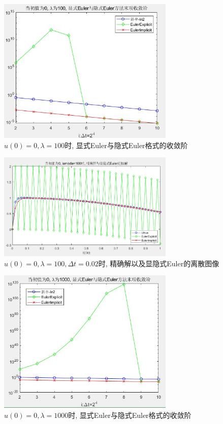 \documentclass[12pt]{article}
\begin{document}
\begin{figure}[H]
	\centering
	\includegraphics[width=0.75\textwidth]{5}
	\caption{$u(0)=0, \lambda=100$时, 显式Euler与隐式Euler格式的收敛阶}
\end{figure}
\begin{figure}[H]
	\centering
	\includegraphics[width=0.75\textwidth]{6}
	\caption{$u(0)=0, \lambda=100,\Delta{t}=0.02$时, 精确解以及显隐式Euler的离散图像}
\end{figure}
\begin{figure}[H]
	\centering
	\includegraphics[width=0.75\textwidth]{7}
	\caption{$u(0)=0, \lambda=1000$时, 显式Euler与隐式Euler格式的收敛阶}
\end{figure}
\end{document}
